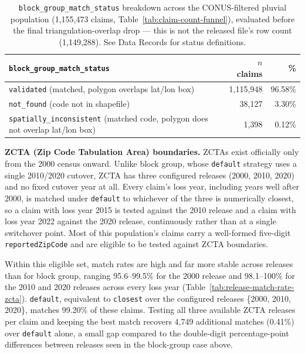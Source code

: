 \begin{table}[H]
\centering
\begin{tabular}{lrr}
\toprule
\texttt{block\_group\_match\_status} & $n$ claims & \% \\
\midrule
\texttt{validated} (matched, polygon overlaps lat/lon box) & 1{,}115{,}948 & 96.58\% \\
\texttt{not\_found} (code not in shapefile) & 38{,}127 & 3.30\% \\
\texttt{spatially\_inconsistent} (matched code, polygon does not overlap lat/lon box) & 1{,}398 & 0.12\% \\
\bottomrule
\end{tabular}
\caption{\texttt{block\_group\_match\_status} breakdown across the
CONUS-filtered pluvial population (1,155,473 claims,
Table~\ref{tab:claim-count-funnel}), evaluated before the final
triangulation-overlap drop --- this is not the released file's row
count (1,149,288). See Data Records for status definitions.}
\label{tab:block-group-match-status}
\end{table}

\textbf{ZCTA (Zip Code Tabulation Area) boundaries.} ZCTAs exist officially only from the 2000
census onward. Unlike block group, whose \texttt{default} strategy uses a
single 2010/2020 cutover, ZCTA has three configured releases (2000,
2010, 2020) and no fixed cutover year at all. Every claim's loss year,
including years well after 2000, is matched under \texttt{default} to
whichever of the three is numerically closest, so a claim with loss
year 2015 is tested against the 2010 release and a claim with loss
year 2022 against the 2020 release, continuously rather than at a
single switchover point. Most of this population's claims carry a
well-formed five-digit \texttt{reportedZipCode} and are eligible to be
tested against ZCTA boundaries.

Within this eligible set, match rates are high and far more stable
across releases than for block group, ranging 95.6--99.5\% for the
2000 release and 98.1--100\% for the 2010 and 2020 releases across
every loss year (Table~\ref{tab:release-match-rate-zcta}).
\texttt{default}, equivalent to \texttt{closest} over the configured
releases \{2000, 2010, 2020\}, matches 99.20\% of these claims. Testing
all three available ZCTA releases per claim and keeping the best match
recovers 4,749 additional matches (0.41\%) over \texttt{default} alone,
a small gap compared to the double-digit percentage-point differences
between releases seen in the block-group case above.

